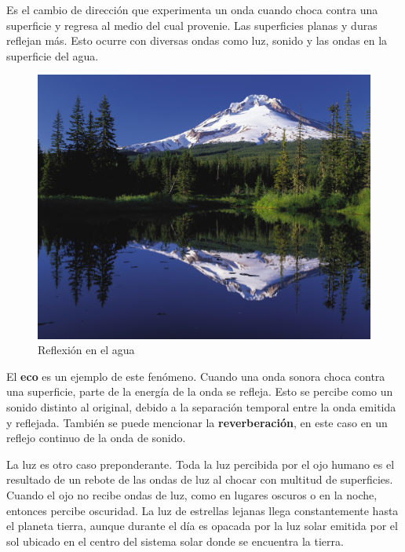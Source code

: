 Es el cambio de dirección que experimenta un onda cuando choca contra una superficie y regresa al medio del cual provenie. Las superficies planas y duras reflejan más. Esto ocurre con diversas ondas como luz, sonido y las ondas en la superficie del agua.

\begin{figure}[H]
  \centering
  \includegraphics[scale=0.15]{imagenes/reflexion_monte.png}
  \caption{Reflexión en el agua\cite{wikireflexion}}
\end{figure}

El \textbf{eco} es un ejemplo de este fenómeno. Cuando una onda sonora choca contra una superficie, parte de la energía de la onda se refleja. Esto se percibe como un sonido distinto al original, debido a la separación temporal entre la onda emitida y reflejada. También se puede mencionar la \textbf{reverberación}, en este caso en un reflejo continuo de la onda de sonido.

La luz es otro caso preponderante. Toda la luz percibida por el ojo humano es el resultado de un rebote de las ondas de luz al chocar con multitud de superficies. Cuando el ojo no recibe ondas de luz, como en lugares oscuros o en la noche, entonces percibe oscuridad. La luz de estrellas lejanas llega constantemente hasta el planeta tierra, aunque durante el día es opacada por la luz solar emitida por el sol ubicado en el centro del sistema solar donde se encuentra la tierra.
